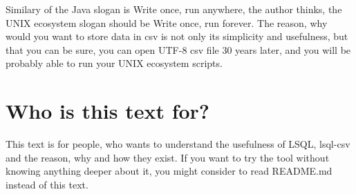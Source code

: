 Similary of the Java slogan is Write once, run anywhere, the author thinks, the UNIX ecosystem slogan should be Write once, run forever. The reason, why would you want to store data in csv is not only its simplicity and usefulness, but that you can be sure, you can open UTF-8 csv file 30 years later, and you will be probably able to run your UNIX ecosystem scripts. 

\section{Who is this text for?}
This text is for people, who wants to understand the usefulness of LSQL, lsql-csv and the reason, why and how they exist. If you want to try the tool without knowing anything deeper about it, you might consider to read README.md instead of this text.
